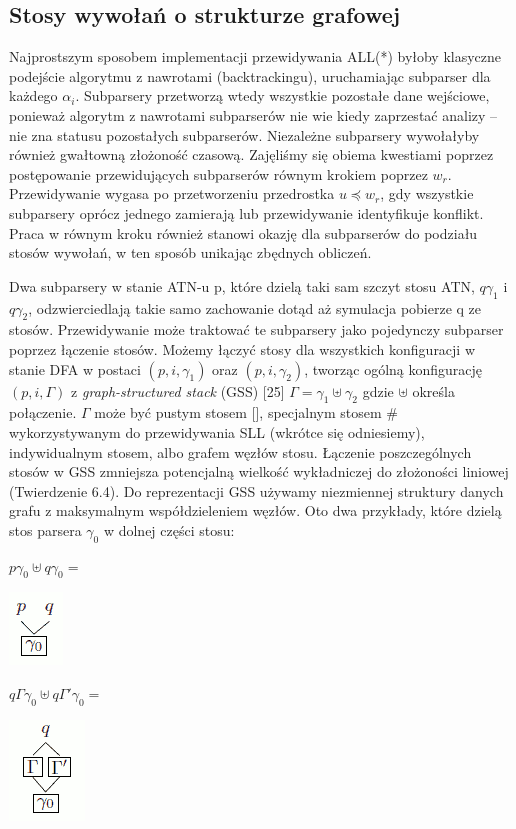 \subsection{Stosy wywołań o strukturze grafowej}
Najprostszym sposobem implementacji przewidywania ALL(*) byłoby klasyczne podejście
algorytmu z nawrotami (backtrackingu), uruchamiając subparser dla każdego $\alpha_i$.
Subparsery przetworzą wtedy wszystkie pozostałe dane wejściowe, ponieważ algorytm z nawrotami
subparserów nie wie kiedy zaprzestać analizy – nie zna statusu pozostałych subparserów.
Niezależne subparsery wywołałyby również gwałtowną złożoność czasową.
Zajęliśmy się obiema kwestiami poprzez postępowanie przewidujących subparserów równym krokiem
poprzez $w_r$. Przewidywanie wygasa po przetworzeniu przedrostka $u \preceq w_r$,
gdy wszystkie subparsery oprócz jednego zamierają lub przewidywanie identyfikuje konflikt.
Praca w równym kroku również stanowi okazję dla subparserów do podziału stosów wywołań,
w ten sposób unikając zbędnych obliczeń.
\par
Dwa subparsery w stanie ATN-u p, które dzielą taki sam szczyt stosu ATN,
$q\gamma_1$ i $q\gamma_2$, odzwierciedlają takie samo zachowanie dotąd aż symulacja pobierze q ze stosów.
Przewidywanie może traktować te subparsery jako pojedynczy subparser poprzez łączenie stosów.
Możemy łączyć stosy dla wszystkich konfiguracji w stanie DFA w postaci $(p,i,\gamma_1)$ oraz $(p,i,\gamma_2)$,
tworząc ogólną konfigurację $(p,i,\Gamma)$ z \textit{graph-structured stack} (GSS) [25]
$\Gamma = \gamma_1 \uplus \gamma_2$ gdzie $\uplus$ określa połączenie.
$\Gamma$ może być pustym stosem [], specjalnym stosem \# wykorzystywanym do przewidywania SLL (wkrótce się odniesiemy),
indywidualnym stosem, albo grafem węzłów stosu.
Łączenie poszczególnych stosów w GSS zmniejsza potencjalną wielkość wykładniczej do złożoności liniowej
(Twierdzenie 6.4). Do reprezentacji GSS używamy niezmiennej struktury danych grafu
z maksymalnym współdzieleniem węzłów.
Oto dwa przykłady, które dzielą stos parsera $\gamma_0$ w dolnej części stosu:
\par
\parbox{\columnwidth}{
  \parbox{0.8in}{
    \centering
    $p \gamma_0 \uplus q \gamma_0 =$
  }
  \parbox{0.5in}{
    \centering
    \includegraphics[scale=0.5]{5_1a}
  }
  \parbox{1.3in}{
    \centering
    $q \Gamma \gamma_0 \uplus q \Gamma' \gamma_0 =$
  }
  \parbox{0.5in}{
    \centering
    \includegraphics[scale=0.5]{5_1b}
  }
}
